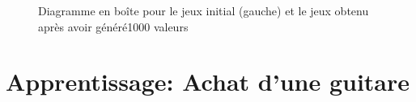 \documentclass[a4paper]{article}
\begin{document}
\begin{appendices}
\begin{figure}[H]
\hfill
{}
\caption{Diagramme en boîte pour le jeux initial (gauche) et le jeux obtenu après avoir généré1000 valeurs }\label{fig:somefiglabel}
\end{figure}





\newpage

\section{Apprentissage: Achat d'une guitare}


\end{appendices}
\end{document}
